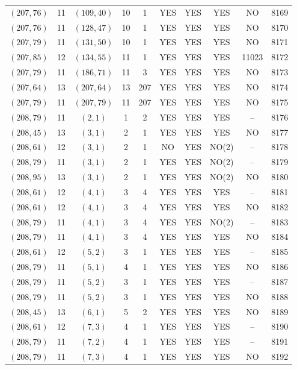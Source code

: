 \begin{longtable}{|c|c|c|c|c|c|c|c|c|c|}
$(207, 76)$ & 11 & $(109, 40)$ & 10 & 1 & YES & YES & YES & NO & 8169\\
$(207, 76)$ & 11 & $(128, 47)$ & 10 & 1 & YES & YES & YES & NO & 8170\\
$(207, 79)$ & 11 & $(131, 50)$ & 10 & 1 & YES & YES & YES & NO & 8171\\
$(207, 85)$ & 12 & $(134, 55)$ & 11 & 1 & YES & YES & YES & 11023 & 8172\\
$(207, 79)$ & 11 & $(186, 71)$ & 11 & 3 & YES & YES & YES & NO & 8173\\
$(207, 64)$ & 13 & $(207, 64)$ & 13 & 207 & YES & YES & YES & NO & 8174\\
$(207, 79)$ & 11 & $(207, 79)$ & 11 & 207 & YES & YES & YES & NO & 8175\\
$(208, 79)$ & 11 & $(2, 1)$ & 1 & 2 & YES & YES & YES & -- & 8176\\
$(208, 45)$ & 13 & $(3, 1)$ & 2 & 1 & YES & YES & YES & NO & 8177\\
$(208, 61)$ & 12 & $(3, 1)$ & 2 & 1 & NO & YES & NO(2) & -- & 8178\\
$(208, 79)$ & 11 & $(3, 1)$ & 2 & 1 & YES & YES & NO(2) & -- & 8179\\
$(208, 95)$ & 13 & $(3, 1)$ & 2 & 1 & YES & YES & NO(2) & NO & 8180\\
$(208, 61)$ & 12 & $(4, 1)$ & 3 & 4 & YES & YES & YES & -- & 8181\\
$(208, 61)$ & 12 & $(4, 1)$ & 3 & 4 & YES & YES & YES & NO & 8182\\
$(208, 79)$ & 11 & $(4, 1)$ & 3 & 4 & YES & YES & NO(2) & -- & 8183\\
$(208, 79)$ & 11 & $(4, 1)$ & 3 & 4 & YES & YES & YES & NO & 8184\\
$(208, 61)$ & 12 & $(5, 2)$ & 3 & 1 & YES & YES & YES & -- & 8185\\
$(208, 79)$ & 11 & $(5, 1)$ & 4 & 1 & YES & YES & YES & NO & 8186\\
$(208, 79)$ & 11 & $(5, 2)$ & 3 & 1 & YES & YES & YES & -- & 8187\\
$(208, 79)$ & 11 & $(5, 2)$ & 3 & 1 & YES & YES & YES & NO & 8188\\
$(208, 45)$ & 13 & $(6, 1)$ & 5 & 2 & YES & YES & YES & NO & 8189\\
$(208, 61)$ & 12 & $(7, 3)$ & 4 & 1 & YES & YES & YES & -- & 8190\\
$(208, 79)$ & 11 & $(7, 2)$ & 4 & 1 & YES & YES & YES & -- & 8191\\
$(208, 79)$ & 11 & $(7, 3)$ & 4 & 1 & YES & YES & YES & NO & 8192\\

\end{longtable}
